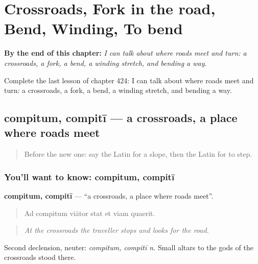 
\chapter{Crossroads, Fork in the road, Bend, Winding, To bend}
\label{ch:la-crossroads-fork-in-the-road-bend-winding-to-bend}

\begin{chapteropening}
\textbf{By the end of this chapter:} \emph{I can talk about where roads meet and turn: a crossroads, a fork, a bend, a winding stretch, and bending a way.}

Complete the last lesson of chapter 424: I can talk about where roads meet and turn: a crossroads, a fork, a bend, a winding stretch, and bending a way.
\end{chapteropening}

\section[compitum, compitī]{compitum, compitī — a crossroads, a place where roads meet}

\label{lesson:LA-C424-compitum}



\begin{quote}
Before the new one: say the Latin for a slope, then the Latin for to step.
\end{quote}

\subsection*{You'll want to know: compitum, compitī}
\textbf{compitum, compitī} — \textquotedblleft{}a crossroads, a place where roads meet\textquotedblright{}.

\begin{quote}
Ad compitum viātor stat et viam quaerit.
\end{quote}

\begin{quote}
\emph{At the crossroads the traveller stops and looks for the road.}
\end{quote}

Second declension, neuter: \emph{compitum, compitī n.} Small altars to the gods of the crossroads stood there.

